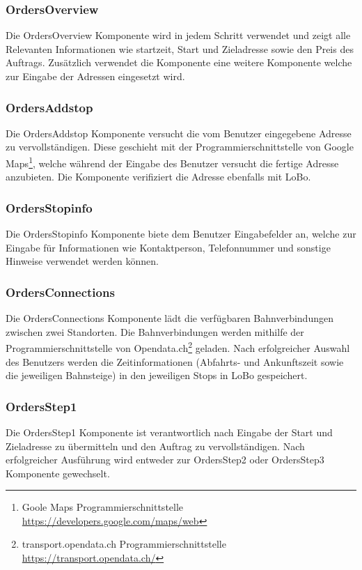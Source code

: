 \subsubsection{OrdersOverview}
Die OrdersOverview Komponente wird in jedem Schritt verwendet und zeigt alle Relevanten Informationen wie startzeit, Start und Zieladresse sowie den Preis des Auftrags. Zusätzlich verwendet die Komponente eine weitere Komponente welche zur Eingabe der Adressen eingesetzt wird.

\subsubsection{OrdersAddstop}
Die OrdersAddstop Komponente versucht die vom Benutzer eingegebene Adresse zu vervollständigen. Diese geschieht mit der Programmierschnittstelle von Google Maps\footnote{Goole Maps Programmierschnittstelle \url{https://developers.google.com/maps/web}}, welche während der Eingabe des Benutzer versucht die fertige Adresse anzubieten. Die Komponente verifiziert die Adresse ebenfalls mit LoBo.

\subsubsection{OrdersStopinfo}
Die OrdersStopinfo Komponente biete dem Benutzer Eingabefelder an, welche zur Eingabe für Informationen wie Kontaktperson, Telefonnummer und sonstige Hinweise verwendet werden können.

\subsubsection{OrdersConnections}
Die OrdersConnections Komponente lädt die verfügbaren Bahnverbindungen zwischen zwei Standorten. Die Bahnverbindungen werden mithilfe der Programmierschnittstelle von Opendata.ch\footnote{transport.opendata.ch Programmierschnittstelle \url{https://transport.opendata.ch/}} geladen. Nach erfolgreicher Auswahl des Benutzers werden die Zeitinformationen (Abfahrts- und Ankunftszeit sowie die jeweiligen Bahnsteige) in den jeweiligen Stops in LoBo gespeichert.

\subsubsection{OrdersStep1}
Die OrdersStep1 Komponente ist verantwortlich nach Eingabe der Start und Zieladresse zu übermitteln und den Auftrag zu vervollständigen. Nach erfolgreicher Ausführung wird entweder zur OrdersStep2 oder OrdersStep3 Komponente gewechselt.

